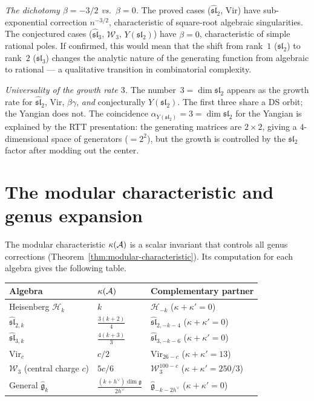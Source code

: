 \emph{The dichotomy $\beta = -3/2$ vs.\ $\beta = 0$.}
The proved cases ($\widehat{\mathfrak{sl}}_2$, $\mathrm{Vir}$) have sub-exponential correction $n^{-3/2}$, characteristic of square-root algebraic singularities.  The conjectured cases ($\widehat{\mathfrak{sl}}_3$, $\mathcal{W}_3$, $Y(\mathfrak{sl}_2)$) have $\beta = 0$, characteristic of simple rational poles.  If confirmed, this would mean that the shift from rank~$1$ ($\mathfrak{sl}_2$) to rank~$2$ ($\mathfrak{sl}_3$) changes the analytic nature of the generating function from algebraic to rational --- a qualitative transition in combinatorial complexity.

\emph{Universality of the growth rate $3$.}
The number~$3 = \dim\mathfrak{sl}_2$ appears as the growth rate for $\widehat{\mathfrak{sl}}_2$, $\mathrm{Vir}$, $\beta\gamma$, \emph{and} conjecturally $Y(\mathfrak{sl}_2)$.  The first three share a DS orbit; the Yangian does not.  The coincidence $\alpha_{Y(\mathfrak{sl}_2)} = 3 = \dim\mathfrak{sl}_2$ for the Yangian is explained by the RTT presentation: the generating matrices are $2 \times 2$, giving a $4$-dimensional space of generators ($= 2^2$), but the growth is controlled by the $\mathfrak{sl}_2$ factor after modding out the center.


\section{The modular characteristic and genus expansion}
\label{sec:modular-characteristic}

The modular characteristic $\kappa(\mathcal{A})$ is a scalar invariant that controls all genus corrections (Theorem~\ref{thm:modular-characteristic}).  Its computation for each algebra gives the following table.

\begin{center}
\renewcommand{\arraystretch}{1.4}
\begin{tabular}{lll}
\toprule
\textbf{Algebra} & $\kappa(\mathcal{A})$ & \textbf{Complementary partner} \\
\midrule
Heisenberg $\mathcal{H}_k$ & $k$ & $\mathcal{H}_{-k}$ \quad ($\kappa + \kappa' = 0$) \\
$\widehat{\mathfrak{sl}}_{2,k}$ & $\frac{3(k+2)}{4}$ & $\widehat{\mathfrak{sl}}_{2,-k-4}$ \quad ($\kappa + \kappa' = 0$) \\
$\widehat{\mathfrak{sl}}_{3,k}$ & $\frac{4(k+3)}{3}$ & $\widehat{\mathfrak{sl}}_{3,-k-6}$ \quad ($\kappa + \kappa' = 0$) \\
$\mathrm{Vir}_c$ & $c/2$ & $\mathrm{Vir}_{26-c}$ \quad ($\kappa + \kappa' = 13$) \\
$\mathcal{W}_3$ (central charge $c$) & $5c/6$ & $\mathcal{W}_3^{100-c}$ \quad ($\kappa + \kappa' = 250/3$) \\
General $\widehat{\mathfrak{g}}_k$ & $\frac{(k+h^\vee)\dim\mathfrak{g}}{2h^\vee}$ & $\widehat{\mathfrak{g}}_{-k-2h^\vee}$ \quad ($\kappa + \kappa' = 0$) \\
\bottomrule
\end{tabular}
\end{center}

